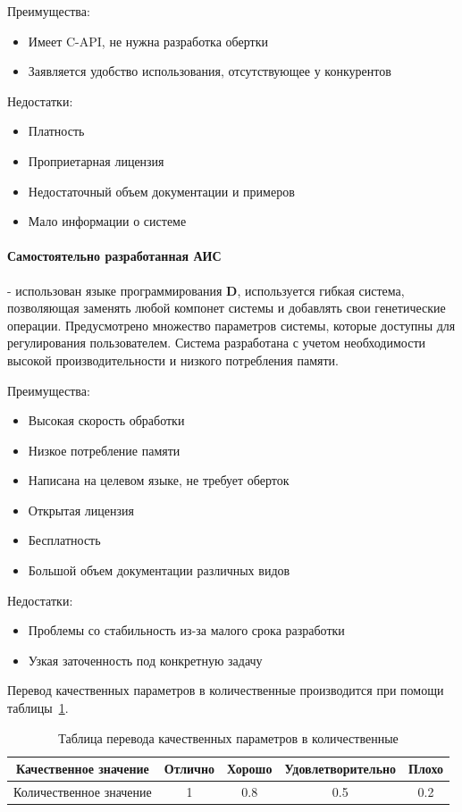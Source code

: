 \documentclass[russian,utf8,emptystyle]{eskdtext}
\begin{document}
\begin{spacing}{1.5}
Преимущества:
\begin{itemize}
\item Имеет C-API, не нужна разработка обертки
\item Заявляется удобство использования, отсутствующее у конкурентов
\end{itemize}

Недостатки:
\begin{itemize}
\item Платность
\item Проприетарная лицензия
\item Недостаточный объем документации и примеров
\item Мало информации о системе
\end{itemize}

\paragraph{Самостоятельно разработанная АИС} - использован языке программирования \textbf{D}, используется гибкая система, позволяющая заменять любой компонет системы и добавлять свои генетические операции. Предусмотрено множество параметров системы, которые доступны для регулирования пользователем. Система разработана с учетом необходимости высокой производительности и низкого потребления памяти.

Преимущества:
\begin{itemize}
\item Высокая скорость обработки
\item Низкое потребление памяти
\item Написана на целевом языке, не требует оберток
\item Открытая лицензия
\item Бесплатность
\item Большой объем документации различных видов
\end{itemize}

Недостатки:
\begin{itemize}
\item Проблемы со стабильность из-за малого срока разработки
\item Узкая заточенность под конкретную задачу
\end{itemize}

Перевод качественных параметров в количественные производится при помощи таблицы~\ref{tab:quality_to_value}.
\begin{table}
\centering
\caption{Таблица перевода качественных параметров в количественные}
\label{tab:quality_to_value}
\begin{tabular}{|c|c|c|c|c|}
\hline 
Качественное значение & Отлично & Хорошо & Удовлетворительно & Плохо \\ 
\hline 
Количественное значение & 1 & 0.8 & 0.5 & 0.2 \\ 
\hline 
\end{tabular} 
\end{table}


\end{spacing}
\end{document}

